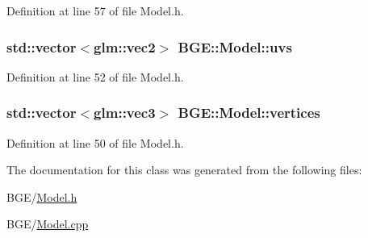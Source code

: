 Definition at line 57 of file Model.\-h.

\hypertarget{class_b_g_e_1_1_model_ab87b9ba4866781f4db316507f0391e00}{
\subsubsection[{uvs}]{\setlength{\rightskip}{0pt plus 5cm}std\-::vector$<$glm\-::vec2$>$ B\-G\-E\-::\-Model\-::uvs}}\label{class_b_g_e_1_1_model_ab87b9ba4866781f4db316507f0391e00}


Definition at line 52 of file Model.\-h.

\hypertarget{class_b_g_e_1_1_model_a4cea848aab716e40b9bde28cd922720d}{
\subsubsection[{vertices}]{\setlength{\rightskip}{0pt plus 5cm}std\-::vector$<$glm\-::vec3$>$ B\-G\-E\-::\-Model\-::vertices}}\label{class_b_g_e_1_1_model_a4cea848aab716e40b9bde28cd922720d}


Definition at line 50 of file Model.\-h.



The documentation for this class was generated from the following files\-:\begin{DoxyCompactItemize}
\item 
B\-G\-E/\hyperlink{_model_8h}{Model.\-h}\item 
B\-G\-E/\hyperlink{_model_8cpp}{Model.\-cpp}\end{DoxyCompactItemize}
